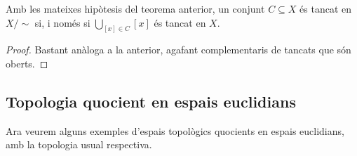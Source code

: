 \documentclass[../main.tex]{subfiles}
\begin{document}
\begin{ter}
\label{ter:topologiaquocienttancat}Amb les mateixes hipòtesis del teorema anterior, un conjunt $C\subseteq X$ és tancat en $X/\sim$ si, i només si $\bigcup_{[x]\in C}[x]$ és tancat en $X$.
\end{ter}
\begin{proof}
Bastant anàloga a la anterior, agafant complementaris de tancats que són oberts.
\end{proof}

\subsection{Topologia quocient en espais euclidians}

Ara veurem alguns exemples d'espais topològics quocients en espais euclidians, amb la topologia usual respectiva.
\end{document}
